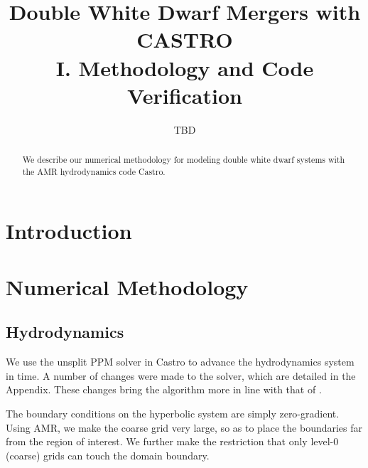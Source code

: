 \documentclass[12pt,preprint]{aastex}
\begin{document}
\title{Double White Dwarf Mergers with CASTRO\\ I. Methodology and Code 
       Verification}


\author{TBD}
\begin{abstract}
We describe our numerical methodology for modeling double white dwarf
systems with the AMR hydrodynamics code Castro.

\end{abstract}

\section{Introduction}




\section{Numerical Methodology}\label{sec:Numerical Methodology}

\subsection{Hydrodynamics}

We use the unsplit PPM solver in Castro to advance the hydrodynamics
system in time.  A number of changes were made to the solver, which are 
detailed in the Appendix.  These changes bring the algorithm more in 
line with that of \cite{ppm}.  

The boundary conditions on the hyperbolic system are simply
zero-gradient.  Using AMR, we make the coarse grid very large, so as
to place the boundaries far from the region of interest.  We further
make the restriction that only level-0 (coarse) grids can touch the
domain boundary.
\end{document}
